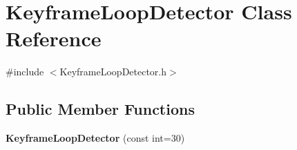 \hypertarget{class_keyframe_loop_detector}{
\section{KeyframeLoopDetector Class Reference}
\label{class_keyframe_loop_detector}
}


{\ttfamily \#include $<$KeyframeLoopDetector.h$>$}

\subsection*{Public Member Functions}
\begin{DoxyCompactItemize}
\item 
\hypertarget{class_keyframe_loop_detector_a2b059bd8fa4faab0af9c4b6af835ec7b}{
{\bfseries KeyframeLoopDetector} (const int=30)}
\label{class_keyframe_loop_detector_a2b059bd8fa4faab0af9c4b6af835ec7b}


\end{DoxyCompactItemize}
